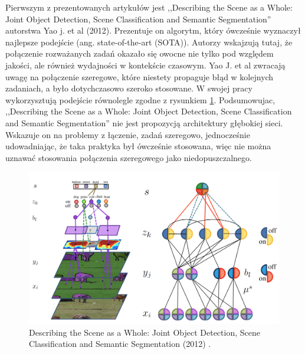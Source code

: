 Pierwszym z prezentowanych artykułów jest ,,Describing the Scene as a Whole: Joint Object Detection, Scene Classification and Semantic Segmentation'' autorstwa Yao j. et al (2012)\cite{yao2012describing}. Prezentuje on algorytm, który ówcześnie wyznaczył najlepsze podejście (ang. state-of-the-art (SOTA)). Autorzy wskajzują tutaj, że połączenie rozważanych zadań okazało się owocne nie tylko pod względem jakości, ale również wydajności w kontekście czasowym. Yao J. et al zwracają uwagę na połączenie szeregowe, które niestety propaguje błąd w kolejnych zadaniach, a było dotychczasowo szeroko stosowane. W swojej pracy wykorzysztują podejście równolegle zgodne z rysunkiem \ref{fig:scene-as-a-whole}. Podsumowujac, ,,Describing the Scene as a Whole: Joint Object Detection, Scene Classification and Semantic Segmentation'' nie jest propozycją architektury głębokiej sieci. Wskazuje on na problemy z łączenie, zadań szeregowo, jednocześnie udowadniając, że taka praktyka był ówcześnie stosowana, więc nie można uznawać stosowania połączenia szeregowego jako niedopuszczalnego.

\begin{figure}[ht!]
    \includegraphics[width=\textwidth]{img/joint-segmentation-and-classification.png}
    \caption{Describing the Scene as a Whole: Joint Object Detection, Scene Classification and Semantic Segmentation (2012) \cite{yao2012describing}.}
    \label{fig:scene-as-a-whole}
\end{figure}


